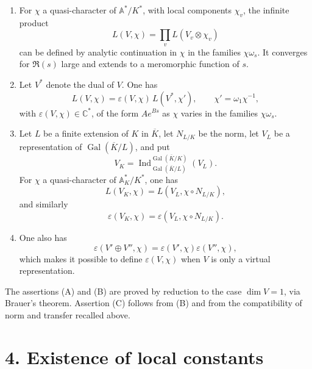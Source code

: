 \documentclass[10pt]{article}
\newcommand{\C}{\mathbb C}
\newcommand{\Gal}{\operatorname{Gal}}
\newcommand{\Ind}{\operatorname{Ind}}
\providecommand{\Gal}{\operatorname{Gal}}
\providecommand{\Gal}{\operatorname{Gal}}
\providecommand{\Gal}{\operatorname{Gal}}
\providecommand{\Gal}{\operatorname{Gal}}
\providecommand{\Ind}{\operatorname{Ind}}
\begin{document}
\begin{enumerate}[label=(\Alph*)]
\item For \(\chi\) a quasi-character of \(\mathbb A^*/K^*\), with local components \(\chi_v\), the infinite product
\[
L(V,\chi)=\prod_vL(V_v\otimes\chi_v)
\]
can be defined by analytic continuation in \(\chi\) in the families \(\chi\omega_s\). It converges for \(\Re(s)\) large and extends to a meromorphic function of \(s\).

\item Let \(V^*\) denote the dual of \(V\). One has
\[
L(V,\chi)=\varepsilon(V,\chi)\,L(V^*,\chi'),
\qquad \chi'=\omega_1\chi^{-1},
\]
with \(\varepsilon(V,\chi)\in\C^*\), of the form \(Ae^{Bs}\) as \(\chi\) varies in the families \(\chi\omega_s\).

\item Let \(L\) be a finite extension of \(K\) in \(\overline K\), let \(N_{L/K}\) be the norm, let \(V_L\) be a representation of \(\Gal(\overline K/L)\), and put
\[
V_K=\Ind_{\Gal(\overline K/L)}^{\Gal(\overline K/K)}(V_L).
\]
For \(\chi\) a quasi-character of \(\mathbb A_K^*/K^*\), one has
\[
L(V_K,\chi)=L(V_L,\chi\circ N_{L/K}),
\]
and similarly
\[
\varepsilon(V_K,\chi)=\varepsilon(V_L,\chi\circ N_{L/K}).
\]
\item One also has
\[
\varepsilon(V'\oplus V'',\chi)=\varepsilon(V',\chi)\varepsilon(V'',\chi),
\]
which makes it possible to define \(\varepsilon(V,\chi)\) when \(V\) is only a virtual representation.
\end{enumerate}
The assertions (A) and (B) are proved by reduction to the case \(\dim V=1\), via Brauer's theorem. Assertion (C) follows from (B) and from the compatibility of norm and transfer recalled above.


\newpage

\section*{4. Existence of local constants}
\end{document}
